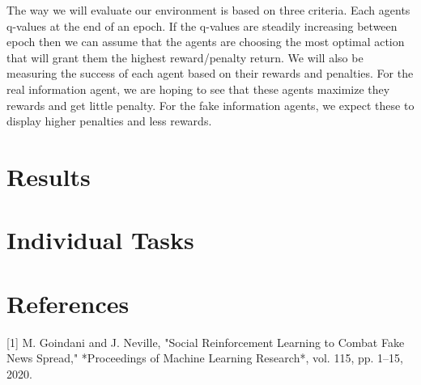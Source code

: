 \documentclass[twoside]{article}
\begin{document}
The way we will evaluate our environment is based on three criteria. Each agents q-values at the end of an epoch. If the q-values are steadily increasing between epoch then we can assume that the agents are choosing the most optimal action that will grant them the highest reward/penalty return. We will also be measuring the success of each agent based on their rewards and penalties. For the real information agent, we are hoping to see that these agents maximize they rewards and get little penalty. For the fake information agents, we expect these to display higher penalties and less rewards.


\section{Results}

\section{Individual Tasks}

\section{References}
[1] M. Goindani and J. Neville, "Social Reinforcement Learning to Combat Fake News Spread," *Proceedings of Machine Learning Research*, vol. 115, pp. 1–15, 2020.
\end{document}
